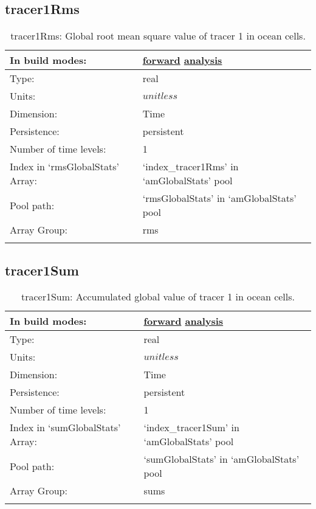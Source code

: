 \subsection[tracer1Rms]{tracer1Rms}
\label{subsec:var_sec_amGlobalStats_tracer1Rms}
\begin{center}
\begin{longtable}{| p{2.0in} | p{4.0in} |}
        \hline 
        In build modes: & \hyperref[subsec:forward_var_tab_amGlobalStats]{forward} \hyperref[subsec:analysis_var_tab_amGlobalStats]{analysis} \\
        \hline 
        Type: & real \\
        \hline 
        Units: & $unitless$ \\
        \hline 
        Dimension: & Time \\
        \hline 
        Persistence: & persistent \\
        \hline 
        Number of time levels: & 1 \\
        \hline 
		 Index in `rmsGlobalStats' Array: & `index\_tracer1Rms' in `amGlobalStats' pool \\
		 \hline 
            Pool path: & `rmsGlobalStats' in `amGlobalStats' pool \\
		 \hline 
		 Array Group: & rms \\
		 \hline 
    \caption{tracer1Rms: Global root mean square value of tracer 1 in ocean cells.}
\end{longtable}
\end{center}
\subsection[tracer1Sum]{tracer1Sum}
\label{subsec:var_sec_amGlobalStats_tracer1Sum}
\begin{center}
\begin{longtable}{| p{2.0in} | p{4.0in} |}
        \hline 
        In build modes: & \hyperref[subsec:forward_var_tab_amGlobalStats]{forward} \hyperref[subsec:analysis_var_tab_amGlobalStats]{analysis} \\
        \hline 
        Type: & real \\
        \hline 
        Units: & $unitless$ \\
        \hline 
        Dimension: & Time \\
        \hline 
        Persistence: & persistent \\
        \hline 
        Number of time levels: & 1 \\
        \hline 
		 Index in `sumGlobalStats' Array: & `index\_tracer1Sum' in `amGlobalStats' pool \\
		 \hline 
            Pool path: & `sumGlobalStats' in `amGlobalStats' pool \\
		 \hline 
		 Array Group: & sums \\
		 \hline 
    \caption{tracer1Sum: Accumulated global value of tracer 1 in ocean cells.}
\end{longtable}
\end{center}
